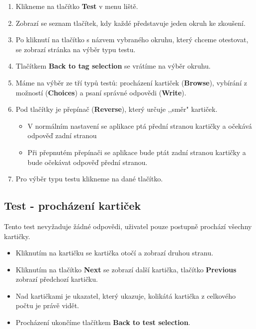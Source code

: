 \documentclass[12pt]{article}
\providecommand{\tightlist}{\setlength{\itemsep}{1pt}\setlength{\parskip}{1pt}}
\begin{document}
\begin{enumerate}
\def\labelenumi{\arabic{enumi}.}
\tightlist
\item
  Klikneme na tlačítko \textbf{Test} v menu liště.
\item
  Zobrazí se seznam tlačítek, kdy každé představuje jeden okruh ke
  zkoušení.
\item
  Po kliknutí na tlačítko s názvem vybraného okruhu, který chceme
  otestovat, se zobrazí stránka na výběr typu testu.
\item
  Tlačítkem \textbf{Back to tag selection} se vrátíme na výběr okruhu.
\item
  Máme na výběr ze tří typů testů: procházení kartiček
  (\textbf{Browse}), vybírání z možností (\textbf{Choices}) a psaní
  správné odpovědi (\textbf{Write}).
\item
  Pod tlačítky je přepínač (\textbf{Reverse}), který určuje ,,směr"
  kartiček.

  \begin{itemize}
  \tightlist
  \item
    V normálním nastavení se aplikace ptá přední stranou kartičky a
    očekává odpověď zadní stranou
  \item
    Při přepnutém přepínači se aplikace bude ptát zadní stranou kartičky
    a bude očekávat odpověď přední stranou.
  \end{itemize}
\item
  Pro výběr typu testu klikneme na dané tlačítko.
\end{enumerate}

\hypertarget{test---prochuxe1zenuxed-kartiux10dek}{%
\subsection{Test - procházení
kartiček}\label{test---prochuxe1zenuxed-kartiux10dek}}

Tento test nevyžaduje žádné odpovědi, uživatel pouze postupně prochází
všechny kartičky.

\begin{itemize}
\tightlist
\item
  Kliknutím na kartičku se kartička otočí a zobrazí druhou stranu.
\item
  Kliknutím na tlačítko \textbf{Next} se zobrazí další kartička,
  tlačítko \textbf{Previous} zobrazí předchozí kartičku.
\item
  Nad kartičkami je ukazatel, který ukazuje, kolikátá kartička z
  celkového počtu je právě vidět.
\item
  Procházení ukončíme tlačítkem \textbf{Back to test selection}.
\end{itemize}
\end{document}
